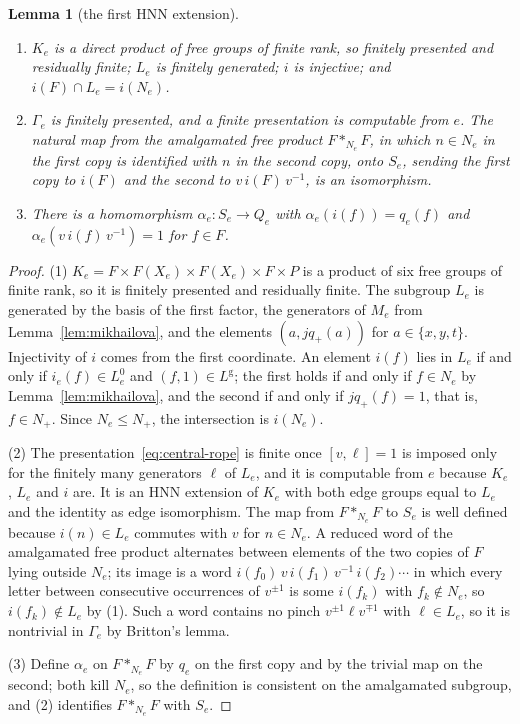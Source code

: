 \documentclass[11pt]{amsart}
\newtheorem{lemma}[theorem]{Lemma}
\theoremstyle{remark}
\theoremstyle{plain}
\begin{document}
\begin{lemma}[the first HNN extension]\label{lem:central-rope}
\begin{enumerate}
\item $K_e$ is a direct product of free groups of finite rank, so
finitely presented and residually finite; $L_e$ is finitely generated;
$i$ is injective; and $i(F)\cap L_e=i(N_e)$.
\item $\Gamma_e$ is finitely presented, and a finite presentation is
computable from $e$.  The natural map from the amalgamated free product
$F*_{N_e}F$, in which $n\in N_e$ in the first copy is identified with
$n$ in the second copy, onto $S_e$, sending the first copy to $i(F)$ and
the second to $v\,i(F)\,v^{-1}$, is an isomorphism.
\item There is a homomorphism $\alpha_e\colon S_e\to Q_e$ with
$\alpha_e(i(f))=q_e(f)$ and $\alpha_e(v\,i(f)\,v^{-1})=1$ for $f\in F$.
\end{enumerate}
\end{lemma}

\begin{proof}
(1) $K_e=F\times F(X_e)\times F(X_e)\times F\times P$ is a product of six
free groups of finite rank, so it is finitely presented and residually
finite.  The subgroup $L_e$ is generated by the basis of the first factor,
the generators of $M_e$ from Lemma~\ref{lem:mikhailova}, and the elements
$(a,jq_+(a))$ for $a\in\{x,y,t\}$.  Injectivity of $i$ comes from the first
coordinate.  An element $i(f)$ lies in $L_e$ if and only if
$i_e(f)\in L^0_e$ and $(f,1)\in L^{\mathrm g}$; the first holds if and only
if $f\in N_e$ by Lemma~\ref{lem:mikhailova}, and the second if and only
if $jq_+(f)=1$, that is, $f\in N_+$.  Since $N_e\le N_+$, the intersection is
$i(N_e)$.

(2) The presentation~\eqref{eq:central-rope} is finite once $[v,\ell]=1$ is
imposed only for the finitely many generators $\ell$ of $L_e$, and it is
computable from $e$ because $K_e$, $L_e$ and $i$ are.  It is an HNN
extension of $K_e$ with both edge groups equal to $L_e$ and the identity
as edge isomorphism.  The map from $F*_{N_e}F$ to $S_e$ is well defined
because $i(n)\in L_e$ commutes with $v$ for $n\in N_e$.  A reduced word of
the amalgamated free product alternates between elements of the two
copies of $F$ lying outside $N_e$; its image is a word
$i(f_0)\,v\,i(f_1)\,v^{-1}\,i(f_2)\cdots$ in which every letter between
consecutive occurrences of $v^{\pm1}$ is some $i(f_k)$ with
$f_k\notin N_e$, so $i(f_k)\notin L_e$ by (1).  Such a word contains no
pinch $v^{\pm1}\ell v^{\mp1}$ with $\ell\in L_e$, so it is nontrivial in
$\Gamma_e$ by Britton's lemma.

(3) Define $\alpha_e$ on $F*_{N_e}F$ by $q_e$ on the first copy and by the
trivial map on the second; both kill $N_e$, so the definition is
consistent on the amalgamated subgroup, and (2) identifies $F*_{N_e}F$
with $S_e$.
\end{proof}
\end{document}
